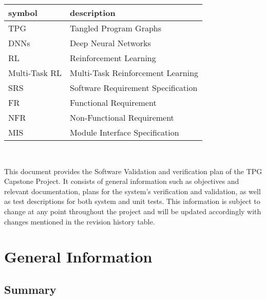 \documentclass[12pt, titlepage]{article}
\begin{document}
\renewcommand{\arraystretch}{1.2}
\begin{tabular}{l l} 
  \toprule		
  \textbf{symbol} & \textbf{description}\\
  \midrule 
  TPG & Tangled Program Graphs\\
  DNNs & Deep Neural Networks\\
  RL & Reinforcement Learning\\
  Multi-Task RL & Multi-Task Reinforcement Learning\\
  SRS & Software Requirement Specification\\
  FR & Functional Requirement\\
  NFR & Non-Functional Requirement\\
  MIS & Module Interface Specification\\
  \bottomrule
\end{tabular}\\



\newpage


This document provides the Software Validation and verification plan of the TPG Capstone Project. It consists of general information such as objectives and relevant documentation, plans for the system's verification and validation, as well as test descriptions for both system and unit tests. This information is subject to change at any point throughout the project and will be updated accordingly with changes mentioned in the revision history table.

\section{General Information}

\subsection{Summary}

\end{document}
